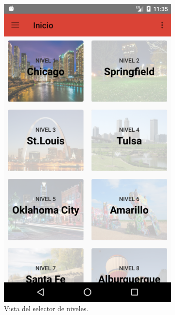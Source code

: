 \documentclass[twoside]{report}
\begin{document}
\begin{figure}[H]
\begin{center}
	\begin{subfigure}[t]{.3\linewidth}
		\includegraphics[scale=0.25]{images/userguide/1.png}
		\caption{Vista del selector de niveles.}
	\end{subfigure}\hspace{3mm}%
	\begin{subfigure}[t]{.3\linewidth}

\end{subfigure}
\end{center}
\end{figure}
\end{document}
